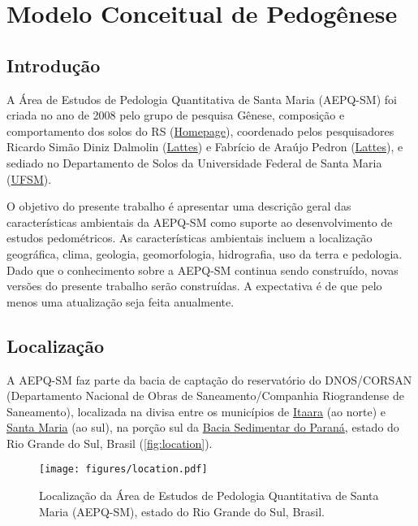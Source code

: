 \artigofalse
\chapter{Modelo Conceitual de Pedogênese}
\label{apen:pedogenesis}

\section{Introdução}

A Área de Estudos de Pedologia Quantitativa de Santa Maria (AEPQ-SM) foi criada no ano de 2008 pelo grupo de pesquisa Gênese, composição e comportamento dos solos do RS (\href{dgp.cnpq.br/dgp/espelhogrupo/9373361709890764}{Homepage}), coordenado pelos pesquisadores Ricardo Simão Diniz Dalmolin (\href{http://lattes.cnpq.br/3735884911693854}{Lattes}) e Fabrício de Araújo Pedron (\href{http://lattes.cnpq.br/6868334304493274}{Lattes}), e sediado no Departamento de Solos da Universidade Federal de Santa Maria (\href{http://site.ufsm.br/}{UFSM}).

O objetivo do presente trabalho é apresentar uma descrição geral das características ambientais da AEPQ-SM como suporte ao desenvolvimento de estudos pedométricos. As características ambientais incluem a localização geográfica, clima, geologia, geomorfologia, hidrografia, uso da terra e pedologia. Dado que o conhecimento sobre a AEPQ-SM continua sendo construído, novas versões do presente trabalho serão construídas. A expectativa é de que pelo menos uma atualização seja feita anualmente.

\section{Localização}

A AEPQ-SM faz parte da bacia de captação do reservatório do DNOS/CORSAN (Departamento Nacional de Obras de Saneamento/Companhia Riograndense de Saneamento), localizada na divisa entre os municípios de \href{http://pt.wikipedia.org/wiki/Itaara}{Itaara} (ao norte) e \href{http://pt.wikipedia.org/wiki/Santa_Maria_\%28Rio_Grande_do_Sul\%29}{Santa Maria} (ao sul), na porção sul da \href{http://pt.wikipedia.org/wiki/Bacia_do_Paran\%C3\%A1}{Bacia Sedimentar do Paraná}, estado do Rio Grande do Sul, Brasil (\autoref{fig:location}).

\begin{figure}[ht]
  \centering
  \texttt{[image: figures/location.pdf]}
  \caption{Localização da Área de Estudos de Pedologia Quantitativa de Santa 
  Maria (AEPQ-SM), estado do Rio Grande do Sul, Brasil.}
  \label{fig:location}
\end{figure}


